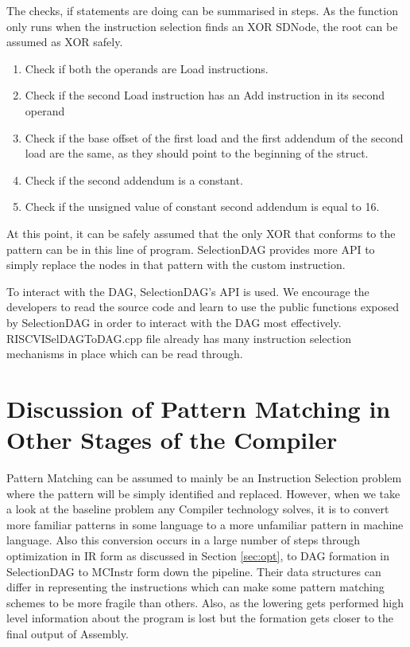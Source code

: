 The checks, if statements are doing can be summarised in steps. As the function only runs when the instruction selection finds an XOR SDNode, the root can be assumed as XOR safely.
\begin{enumerate}
    \item Check if both the operands are Load instructions.
    \item Check if the second Load instruction has an Add instruction in its second operand
    \item Check if the base offset of the first load and the first addendum of the second load are the same, as they should point to the beginning of the struct.
    \item Check if the second addendum is a constant.
    \item Check if the unsigned value of constant second addendum is equal to 16.
\end{enumerate}

At this point, it can be safely assumed that the only XOR that conforms to the pattern can be in this line of program. SelectionDAG provides more API to simply replace the nodes in that pattern with the custom instruction.


To interact with the DAG, SelectionDAG's API is used. We encourage the developers to read the source code and learn to use the public functions exposed by SelectionDAG in order to interact with the DAG most effectively. RISCVISelDAGToDAG.cpp file already has many instruction selection mechanisms in place which can be read through. 

\section{Discussion of Pattern Matching in Other Stages of the Compiler}\label{sec:patmatchdisc}
Pattern Matching can be assumed to mainly be an Instruction Selection problem where the pattern will be simply identified and replaced. However, when we take a look at the baseline problem any Compiler technology solves, it is to convert more familiar patterns in some language to a more unfamiliar pattern in machine language. Also this conversion occurs in a large number of steps through optimization in IR form as discussed in Section \ref{sec:opt}, to DAG formation in SelectionDAG to MCInstr form down the pipeline. Their data structures can differ in representing the instructions which can make some pattern matching schemes to be more fragile than others. Also, as the lowering gets performed high level information about the program is lost but the formation gets closer to the final output of Assembly. 

